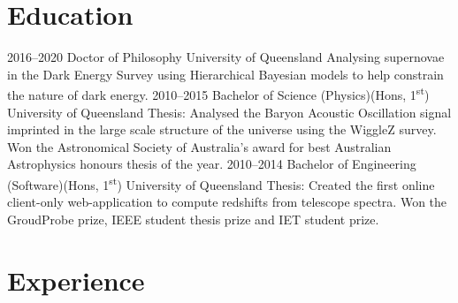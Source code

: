 


\section{Education}

\begin{entrylist}
\entry
{2016--2020}
{Doctor of Philosophy}
{University of Queensland}
{Analysing supernovae in the Dark Energy Survey using Hierarchical Bayesian models to help constrain the nature of dark energy.}
\entry
{2010--2015}
{Bachelor of Science {\normalfont (Physics)(Hons, 1\textsuperscript{st})}}
{University of Queensland}
{Thesis: Analysed the Baryon Acoustic Oscillation signal imprinted in the large scale structure of the universe using the WiggleZ survey. Won the Astronomical Society of Australia's award for best Australian Astrophysics honours thesis of the year.}
\entry
{2010--2014}
{Bachelor of Engineering {\normalfont (Software)(Hons, 1\textsuperscript{st})}}
{University of Queensland}
{Thesis: Created the first online client-only web-application to compute redshifts from telescope spectra. Won the GroudProbe prize, IEEE student thesis prize and IET student prize.}

\end{entrylist}

\section{Experience}


